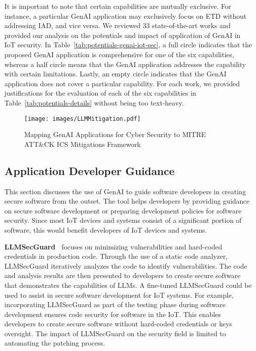 %
It is important to note that certain capabilities are mutually exclusive.
For instance, a particular GenAI application may exclusively focus on ETD without addressing IAD, and vice versa.
We reviewed 33 state-of-the-art works and provided our analysis on the potentials and impact of application of GenAI in IoT security.
In Table~\ref{tab:potentials-genai-iot-sec}, a full circle indicates that the proposed GenAI application is comprehensive for one of the six capabilities, whereas a half circle means that the GenAI application addresses the capability with certain limitations.
Lastly, an empty circle indicates that the GenAI application does not cover a particular capability.
For each work, we provided justifications for the evaluation of each of the six capabilities in Table~\ref{tab:potentials-details} without being too text-heavy.
%
\begin{figure*}[!ht]
    \centering
    \texttt{[image: images/LLMMitigation.pdf]}
    \caption{Mapping GenAI Applications for Cyber Security to MITRE ATT\&CK ICS Mitigations Framework}
    \label{fig:genai-attack-mappings}
\end{figure*}
%
\subsection{Application Developer Guidance} \label{subsec:adg}
%
This section discusses the use of GenAI to guide software developers in creating secure software from the outset.
The tool helps developers by providing guidance on secure software development or preparing development policies for software security.
Since most IoT devices and systems consist of a significant portion of software, this would benefit developers of IoT devices and systems.

\smallskip
\noindent\textbf{LLMSecGuard~\citet{Kavian2024LLMSG}} focuses on minimizing vulnerabilities and hard-coded credentials in production code.
Through the use of a static code analyzer, LLMSecGuard iteratively analyzes the code to identify vulnerabilities.
The code and analysis results are then presented to developers to create secure software that demonstrates the capabilities of LLMs.
A fine-tuned LLMSecGuard could be used to assist in secure software development for IoT systems.
For example, incorporating LLMSecGuard as part of the testing phase during software development ensures code security for software in the IoT.
This enables developers to create secure software without hard-coded credentials or keys oversight.
The impact of LLMSecGuard on the security field is limited to automating the patching process.

